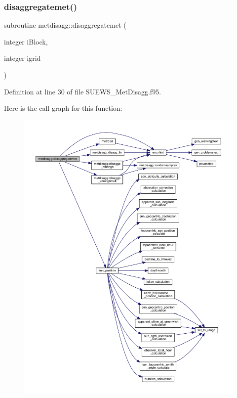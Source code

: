 \subsubsection{\texorpdfstring{disaggregatemet()}{disaggregatemet()}}
{\footnotesize\ttfamily subroutine metdisagg\+::disaggregatemet (\begin{DoxyParamCaption}\item[{integer}]{i\+Block,  }\item[{integer}]{igrid }\end{DoxyParamCaption})}



Definition at line 30 of file S\+U\+E\+W\+S\+\_\+\+Met\+Disagg.\+f95.

Here is the call graph for this function\+:\nopagebreak
\begin{figure}[H]
\begin{center}
\leavevmode
\includegraphics[width=350pt]{namespacemetdisagg_a9b4db8548b33c73cf14f7280cb8de1b6_cgraph}
\end{center}
\end{figure}
\mbox{\label{namespacemetdisagg_a23b40d11c1242cb3e4fc0dff94f960db}} 
